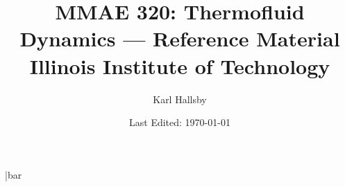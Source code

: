 \DeclareSIUnit\bar{bar}
\DeclareSIUnit{}
\DeclareSIUnit{}
\DeclareSIUnit{}
\DeclareSIUnit{}

\DeclareSIUnit{}
\DeclareSIUnit{}

\DeclareSIUnit{}
\DeclareSIUnit{}

\DeclareSIUnit{}
\DeclareSIUnit{}

\DeclareSIUnit{}

\newcommand{\Density}{\rho}
\newcommand{\Pressure}{P}
\newcommand{\Temp}{T}
\newcommand{\Volume}{V}
\newcommand{\Mass}{m}
\newcommand{\Energy}{E}
\newcommand{\Gravity}{g}
\newcommand{\SpecificWeight}{\gamma_{s}}
\newcommand{\SpecificVolume}{v_{s}}
\newcommand{\SpecificTotEnergy}{e_{s}}
\newcommand{\SpecificGravity}{\mathrm{SG}}


\begin{titlepage}
  \title{MMAE 320: Thermofluid Dynamics --- Reference Material \\ Illinois Institute of Technology}
  \author{Karl Hallsby}
  \date{Last Edited: \today} %
\end{titlepage}


\maketitle
{} %
\tableofcontents
\clearpage
\listoftheorems[ignoreall, show={definition, Definition}]
\clearpage
{} %





\appendix
{}

\clearpage


\clearpage


\clearpage


\clearpage


\clearpage
\printbibliography{}


